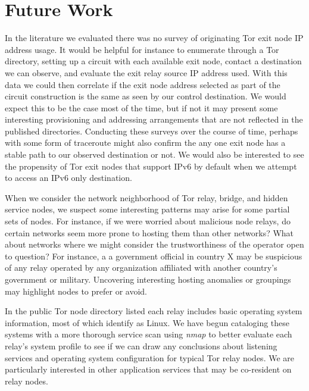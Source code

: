 \documentclass[sigconf]{acmart}
\begin{document}
\section{Future Work}\label{sec:future_work}

In the literature we evaluated there was no survey of originating Tor
exit node IP address usage.  It would be helpful for instance to
enumerate through a Tor directory, setting up a circuit with each
available exit node, contact a destination we can observe, and evaluate
the exit relay source IP address used.  With this data we could then
correlate if the exit node address selected as part of the circuit
construction is the same as seen by our control destination.  We
would expect this to be the case most of the time, but if not it may
present some interesting provisioning and addressing arrangements that
are not reflected in the published directories.  Conducting these
surveys over the course of time, perhaps with some form of traceroute
might also confirm the any one exit node has a stable path to our
observed destination or not.  We would also be interested to see the
propensity of Tor exit nodes that support IPv6 by default when we
attempt to access an IPv6 only destination.

When we consider the network neighborhood of Tor relay, bridge, and
hidden service nodes, we suspect some interesting patterns may arise for
some partial sets of nodes.  For instance, if we were worried about
malicious node relays, do certain networks seem more prone to hosting
them than other networks?  What about networks where we might consider
the trustworthiness of the operator open to question?  For instance, a
a government official in country X may be suspicious of any relay
operated by any organization affiliated with another country's
government or military.  Uncovering interesting hosting anomalies or
groupings may highlight nodes to prefer or avoid.

In the public Tor node directory listed each relay includes basic
operating system information, most of which identify as Linux.  We have
begun cataloging these systems with a more thorough service scan using
\emph{nmap} to better evaluate each relay's system profile to see if we
can draw any conclusions about listening services and operating system
configuration for typical Tor relay nodes.  We are particularly
interested in other application services that may be co-resident on
relay nodes.
\end{document}
